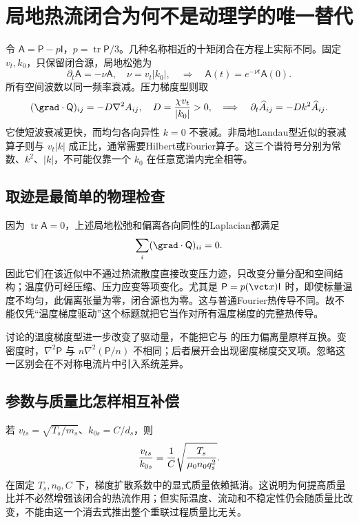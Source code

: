 \section{局地热流闭合为何不是动理学的唯一替代}
令 $\mathsf A=\mathsf P-p\mathsf I$，$p=\operatorname{tr}\mathsf P/3$。几种名称相近的十矩闭合在方程上实际不同。固定 $v_t,k_0$，只保留闭合源，局地松弛为
\begin{equation}
\partial_t\mathsf A=-\nu\mathsf A,\quad \nu=v_t|k_0|,
\quad\Longrightarrow\quad\mathsf A(t)=e^{-\nu t}\mathsf A(0).
\end{equation}
所有空间波数以同一频率衰减。压力梯度型则取
\begin{equation}
(\grad\cdot\mathsf Q)_{ij}=-D\nabla^2 A_{ij},\quad
D={\chi v_t\over |k_0|}>0,
\quad\Longrightarrow\quad
\partial_t\widehat A_{ij}=-Dk^2\widehat A_{ij}.
\end{equation}
它使短波衰减更快，而均匀各向异性 $k=0$ 不衰减。非局地Landau型近似的衰减算子则与 $v_t|k|$ 成正比，通常需要Hilbert或Fourier算子。这三个谱符号分别为常数、$k^2$、$|k|$，不可能仅靠一个 $k_0$ 在任意宽谱内完全相等。\citep{Wang2015,Ng2017,L256,E552}

\subsection{取迹是最简单的物理检查}
因为 $\operatorname{tr}\mathsf A=0$，上述局地松弛和偏离各向同性的Laplacian都满足
\begin{equation}\sum_i(\grad\cdot\mathsf Q)_{ii}=0.
\end{equation}
因此它们在该近似中不通过热流散度直接改变压力迹，只改变分量分配和空间结构；温度仍可经压缩、压力应变等项变化。尤其是 $\mathsf P=p(\vct x)\mathsf I$ 时，即使标量温度不均匀，此偏离张量为零，闭合源也为零。这与普通Fourier热传导不同。故不能仅凭“温度梯度驱动”这个标题就把它当作对所有温度梯度的完整热传导。

\citet{Ng2020}讨论的温度梯度型进一步改变了驱动量，不能把它与 \citet{L256,E552} 的压力偏离量原样互换。变密度时，$\nabla^2\mathsf P$ 与 $n\nabla^2(\mathsf P/n)$ 不相同；后者展开会出现密度梯度交叉项。忽略这一区别会在不对称电流片中引入系统差异。

\subsection{参数与质量比怎样相互补偿}
若 $v_{ts}=\sqrt{T_s/m_s}$、$k_{0s}=C/d_s$，则
\begin{equation}
{v_{ts}\over k_{0s}}={1\over C}\sqrt{T_s\over\mu_0n_0q_s^2}.
\end{equation}
在固定 $T_s,n_0,C$ 下，梯度扩散系数中的显式质量依赖抵消。这说明为何提高质量比并不必然增强该闭合的热流作用；但实际温度、流动和不稳定性仍会随质量比改变，不能由这一个消去式推出整个重联过程质量比无关。


